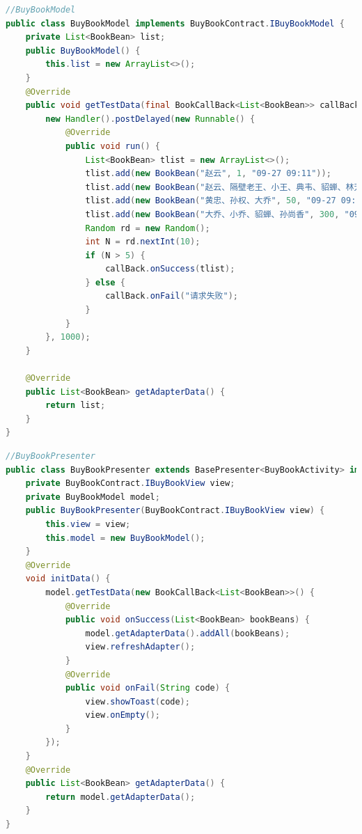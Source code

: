 \documentclass[a4paper,12pt]{ctexart}
\begin{document}
\begin{lstlisting}[language=java]
//BuyBookModel
public class BuyBookModel implements BuyBookContract.IBuyBookModel {
	private List<BookBean> list;
	public BuyBookModel() {
		this.list = new ArrayList<>();
	}
	@Override
	public void getTestData(final BookCallBack<List<BookBean>> callBack) {
		new Handler().postDelayed(new Runnable() {
			@Override
			public void run() {
				List<BookBean> tlist = new ArrayList<>();
				tlist.add(new BookBean("赵云", 1, "09-27 09:11"));
				tlist.add(new BookBean("赵云、隔壁老王、小王、典韦、貂蝉、林芳、曹操、刘备、关羽、黄忠、张飞、诸葛孔明", 10, "09-27 09:11"));
				tlist.add(new BookBean("黄忠、孙权、大乔", 50, "09-27 09:11"));
				tlist.add(new BookBean("大乔、小乔、貂蝉、孙尚香", 300, "09-27 09:11"));
				Random rd = new Random();
				int N = rd.nextInt(10);
				if (N > 5) {
					callBack.onSuccess(tlist);
				} else {
					callBack.onFail("请求失败");
				}
			}
		}, 1000);
	}
	
	@Override
	public List<BookBean> getAdapterData() {
		return list;
	}
}
\end{lstlisting}
\begin{lstlisting}[language=java]
//BuyBookPresenter
public class BuyBookPresenter extends BasePresenter<BuyBookActivity> implements BuyBookContract.IBuyBookPresenter {
	private BuyBookContract.IBuyBookView view;
	private BuyBookModel model;
	public BuyBookPresenter(BuyBookContract.IBuyBookView view) {
		this.view = view;
		this.model = new BuyBookModel();
	}
	@Override
	void initData() {
		model.getTestData(new BookCallBack<List<BookBean>>() {
			@Override
			public void onSuccess(List<BookBean> bookBeans) {
				model.getAdapterData().addAll(bookBeans);
				view.refreshAdapter();
			}
			@Override
			public void onFail(String code) {
				view.showToast(code);
				view.onEmpty();
			}
		});
	}
	@Override
	public List<BookBean> getAdapterData() {
		return model.getAdapterData();
	}
}
\end{lstlisting}
\end{document}
